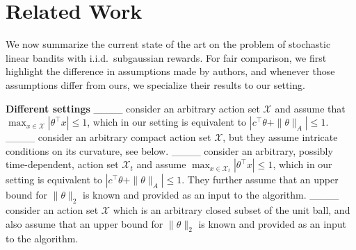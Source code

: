 \section{Related Work}
\label{ssec:Related Work}

We now summarize the current state of the art on the problem of stochastic linear
bandits with i.i.d.\ subgaussian rewards.
For fair comparison, we first highlight the difference in assumptions made by
authors, and whenever those assumptions differ from ours, we specialize their results
to our setting.

\textbf{Different settings} ____ consider an arbitrary action set $\mathcal{X}$ and assume that $\max_{x \in \mathcal{X}} |\theta^\top x| \le 1$, which in our setting is equivalent to $|c^\top \theta + \|\theta\|_{A}| \le 1$. 
____ consider an arbitrary compact action set $\mathcal{X}$, but they assume intricate conditions on its curvature, see below. 
____ consider an arbitrary, possibly time-dependent, action set $\mathcal{X}_t$ and assume $\max_{x \in \mathcal{X}_t} |\theta^\top x | \le 1$, which in our setting is equivalent to $|c^\top \theta + \|\theta\|_{A}| \le 1$. 
They further assume that an upper bound for $\|\theta\|_{2}$ is known and provided as an input to the algorithm. 
____ consider an action set $\mathcal{X}$ which is an arbitrary closed subset of the unit ball, and also assume that an upper bound for $\|\theta\|_{2}$ is known and provided as an input to the algorithm. 

